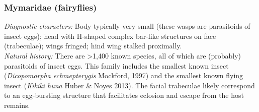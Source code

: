 \documentclass[letterpaper, 11pt]{article}
\begin{document}
\subsubsection{Mymaridae (fairyflies)}
\noindent{}\textit{Diagnostic characters:} Body typically very small (these wasps are parasitoids of insect eggs); head with H-shaped complex bar-like structures on face (trabeculae); wings fringed; hind wing stalked proximally.\\

\noindent{}\textit{Natural history:} There are \textgreater1,400 known species, all of which are (probably) parasitoids of insect eggs. This family includes the smallest known insect (\textit{Dicopomorpha echmepterygis} Mockford, 1997) and the smallest known flying insect (\textit{Kikiki huna} Huber \& Noyes 2013). The facial trabeculae likely correspond to an egg-bursting structure that facilitates eclosion and escape from the host remains.
\end{document}
